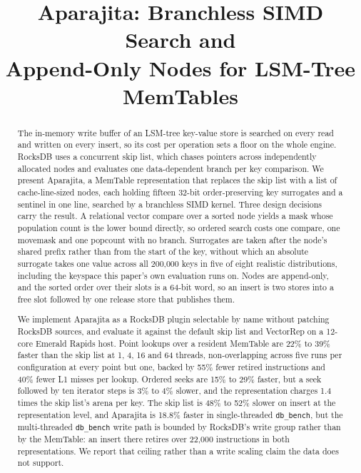 \documentclass[conference]{IEEEtran}
\begin{document}
\title{Aparajita: Branchless SIMD Search and\\
       Append-Only Nodes for LSM-Tree MemTables}

\author{
}

\maketitle

\begin{abstract}
The in-memory write buffer of an LSM-tree key-value store is searched on every
read and written on every insert, so its cost per operation sets a floor on the
whole engine. RocksDB uses a concurrent skip list, which chases pointers across
independently allocated nodes and evaluates one data-dependent branch per key
comparison. We present Aparajita, a MemTable representation that replaces the
skip list with a list of cache-line-sized nodes, each holding fifteen 32-bit
order-preserving key surrogates and a sentinel in one line, searched by a
branchless SIMD kernel. Three
design decisions carry the result. A relational vector compare over a sorted node
yields a mask whose population count is the lower bound directly, so ordered
search costs one compare, one movemask and one popcount with no branch. Surrogates
are taken after the node's shared prefix rather than from the start of the key,
without which an absolute surrogate takes one value across all 200{,}000 keys in
five of eight realistic distributions, including the keyspace this paper's own
evaluation runs on. Nodes are append-only, and the sorted order
over their slots is a 64-bit word, so an insert is two stores into a free slot
followed by one release store that publishes them.

We implement Aparajita as a RocksDB plugin selectable by name without patching
RocksDB sources, and evaluate it against the default skip list and VectorRep on a
12-core Emerald Rapids host. Point lookups over a resident MemTable are 22\% to
39\% faster than the skip list at 1, 4, 16 and 64 threads, non-overlapping across
five runs per configuration at every point but one, backed by 55\% fewer retired
instructions and 40\% fewer L1 misses per lookup. Ordered seeks are 15\% to 29\%
faster, but a seek followed by ten iterator steps is 3\% to 4\% slower, and the
representation charges 1.4 times the skip list's arena per key. The skip list is
48\% to 52\% slower on insert at the representation level, and Aparajita is 18.8\%
faster in single-threaded \texttt{db\_bench},
but the multi-threaded \texttt{db\_bench} write path is bounded by RocksDB's write
group rather than by the MemTable: an insert there retires over 22{,}000
instructions in both representations. We report that ceiling rather than a write
scaling claim the data does not support.
\end{abstract}
\end{document}

